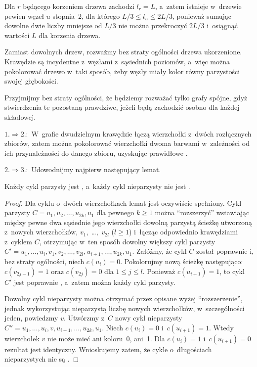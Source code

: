 Dla $r$ będącego korzeniem drzewa zachodzi $l_r=L$, a~zatem istnieje w~drzewie pewien węzeł $u$ stopnia~2, dla którego $L/3\le l_u\le 2L/3$, ponieważ sumując dowolne dwie liczby mniejsze od $L/3$ nie można przekroczyć $2L/3$ i~osiągnąć wartości $L$ dla korzenia drzewa.

\problems

\subproblem %
Zamiast dowolnych drzew, rozważmy bez straty ogólności drzewa ukorzenione. Krawędzie są incydentne z~węzłami z~sąsiednich poziomów, a~więc można pokolorować drzewo w~taki sposób, żeby węzły miały kolor równy parzystości swojej głębokości.

\subproblem %
Przyjmijmy bez straty ogólności, że będziemy rozważać tylko grafy spójne, gdyż stwierdzenia te pozostaną prawdziwe, jeżeli będą zachodzić osobno dla każdej składowej.
\bigskip

$1.\Rightarrow 2.\!\!:$ W~grafie dwudzielnym krawędzie łączą wierzchołki z~dwóch rozłącznych zbiorów, zatem można pokolorować wierzchołki dwoma barwami w~zależności od ich przynależności do danego zbioru, uzyskując prawidłowe .
\bigskip

$2.\Rightarrow 3.\!\!:$ Udowodnijmy najpierw następujący lemat.
\begin{lemat}
	Każdy cykl parzysty jest , a~każdy cykl nieparzysty nie jest .
\end{lemat}
\begin{proof}
Dla cyklu o~dwóch wierzchołkach lemat jest oczywiście spełniony. Cykl parzysty $C=u_1,u_2,\dots,u_{2k},u_1$ dla pewnego $k\ge1$ można ``rozszerzyć'' wstawiając między pewne dwa sąsiednie jego wierzchołki dowolną parzystą ścieżkę utworzoną z~nowych wierzchołków, $v_1$,~\dots,~$v_{2l}$ ($l\ge1$) i~łącząc odpowiednio krawędziami z~cyklem $C$, otrzymując w~ten sposób dowolny większy cykl parzysty $C' = u_1,\dots,u_i,v_1,v_2,\dots,v_{2l},u_{i+1},\dots,u_{2k},u_1$. Załóżmy, że cykl $C$ został poprawnie  i, bez straty ogólności, niech $c(u_i)=0$. Pokolorujmy nową ścieżkę następująco: $c(v_{2j-1})=1$ oraz $c(v_{2j})=0$ dla $1\le j\le l$. Ponieważ $c(u_{i+1})=1$, to cykl $C'$ jest poprawnie , a~zatem można  każdy cykl parzysty.

Dowolny cykl nieparzysty można otrzymać przez opisane wyżej ``rozszerzenie'', jednak wykorzystując nieparzystą liczbę nowych wierzchołków, w~szczególności jeden, powiedzmy $v$. Utwórzmy z~$C$ nowy cykl nieparzysty $C''=u_1,\dots,u_i,v,u_{i+1},\dots,u_{2k},u_1$. Niech $c(u_i)=0$ i~$c(u_{i+1})=1$. Wtedy wierzchołek $v$ nie może mieć ani koloru~0, ani~1. Dla $c(u_i)=1$ i~$c(u_{i+1})=0$ rezultat jest identyczny. Wnioskujemy zatem, że cykle o~długościach nieparzystych nie są .
\end{proof}

